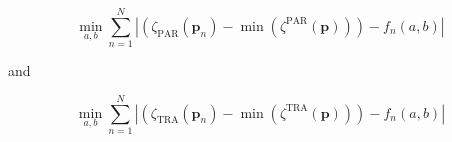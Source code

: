 \begin{equation}
	\min_{a, b} \sum_{n=1}^{N} \left|\left(\zeta_\text{PAR}(\textbf{p}_n) - \min(\zeta^\text{PAR}(\textbf{p}))\right) - f_n(a, b)\right|	
	\label{ch3:equ:find-exponential-par}
\end{equation}

and

\begin{equation}
	\min_{a, b} \sum_{n=1}^{N} \left|\left(\zeta_\text{TRA}(\textbf{p}_n) - \min(\zeta^\text{TRA}(\textbf{p}))\right) - f_n(a, b)\right|	
	\label{ch3:equ:find-exponential-tra}	
\end{equation}